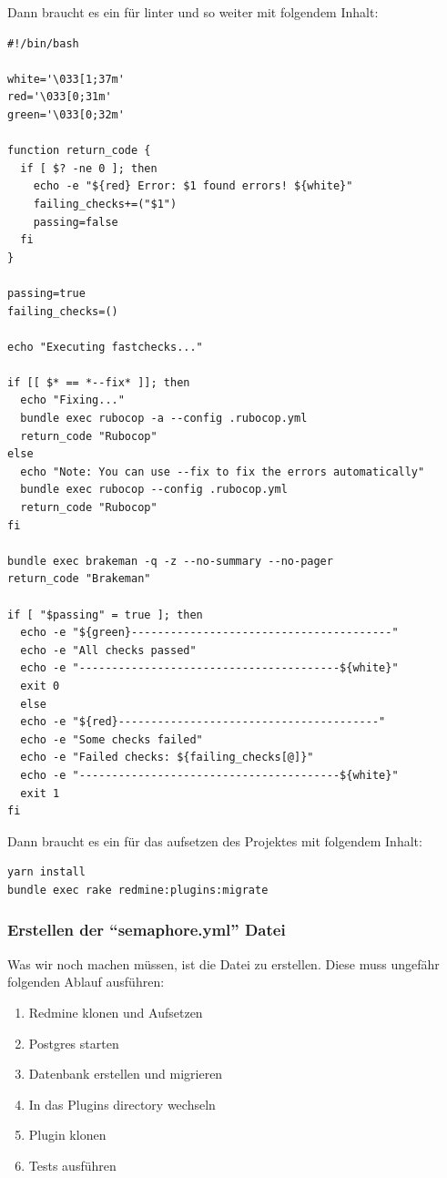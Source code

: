 \begin{minipage}{\textwidth}
  Dann braucht es ein  für linter und so weiter mit folgendem Inhalt:
  \begin{codebox}[]
    \begin{verbatim}
#!/bin/bash

white='\033[1;37m'
red='\033[0;31m'
green='\033[0;32m'

function return_code {
  if [ $? -ne 0 ]; then
    echo -e "${red} Error: $1 found errors! ${white}"
    failing_checks+=("$1")
    passing=false
  fi
}

passing=true
failing_checks=()

echo "Executing fastchecks..."

if [[ $* == *--fix* ]]; then
  echo "Fixing..."
  bundle exec rubocop -a --config .rubocop.yml
  return_code "Rubocop"
else 
  echo "Note: You can use --fix to fix the errors automatically"
  bundle exec rubocop --config .rubocop.yml
  return_code "Rubocop"
fi

bundle exec brakeman -q -z --no-summary --no-pager
return_code "Brakeman"

if [ "$passing" = true ]; then
  echo -e "${green}----------------------------------------"
  echo -e "All checks passed"
  echo -e "----------------------------------------${white}"
  exit 0
  else
  echo -e "${red}----------------------------------------"
  echo -e "Some checks failed"
  echo -e "Failed checks: ${failing_checks[@]}"
  echo -e "----------------------------------------${white}"
  exit 1
fi
    \end{verbatim}
  \end{codebox}
  
\end{minipage}

\begin{minipage}{\textwidth}
  Dann braucht es ein  für das aufsetzen des Projektes mit folgendem Inhalt:
  \begin{codebox}[]
    \begin{verbatim}
yarn install
bundle exec rake redmine:plugins:migrate
    \end{verbatim}
  \end{codebox}
\end{minipage}

\subsubsection{Erstellen der \enquote{semaphore.yml} Datei}
Was wir noch machen müssen, ist die  Datei zu erstellen. Diese muss ungefähr folgenden Ablauf
ausführen:
\begin{enumerate}
  \item Redmine klonen und Aufsetzen
  \item Postgres starten
  \item Datenbank erstellen und migrieren
  \item In das Plugins directory wechseln
  \item Plugin klonen
  \item Tests ausführen
\end{enumerate}

